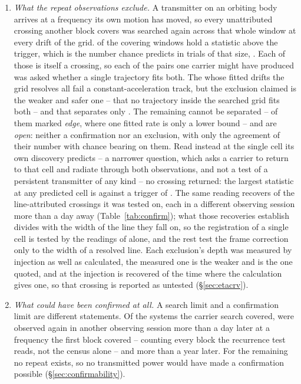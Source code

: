 \begin{enumerate}[leftmargin=1.6em,itemsep=4pt,topsep=4pt,parsep=0pt]
\item \emph{What the repeat observations exclude.} A transmitter on an
orbiting body arrives at a frequency its own motion has moved, so every
unattributed crossing another block covers was searched again across that
whole window at every drift of the grid. \WdNExc{} of the \WdNCov{} covering
windows hold a statistic above the trigger, which is the number chance
predicts in trials of that size, \WdExpect. Each of those is itself a
crossing, so each of the \TjNPair{} pairs one carrier might have produced
was asked whether a single trajectory fits both. The \TjNPower{} whose
fitted drifts the grid resolves all fail a constant-acceleration track, but
the exclusion claimed is the weaker and safer one -- that no trajectory
inside the searched grid fits both -- and that separates only \TjNExcl.
The remaining \TjNOpen{} cannot be separated -- \TjNPairEdge{} of them
marked \emph{edge}, where one fitted rate is only a lower bound -- and are
\emph{open}: neither a confirmation nor an exclusion, with only the
agreement of their number with chance bearing on them. Read instead at the single cell
its own discovery predicts -- a narrower question, which asks a carrier to
return to that cell and radiate through both observations, and not a test of a
persistent transmitter of any kind -- no crossing returned: the largest
statistic at any predicted cell is \RcTMax{} against a trigger of
\StageNullTrig. The same reading recovers \MkAttrRecur{} of the
\MkAttrTested{} line-attributed crossings it was tested on, each in a
different observing session more than a day away
(Table~\ref{tab:confirm}); what those recoveries establish divides with the
width of the line they fall on, so the registration of a single cell is
tested by the \RgRegNUnres{} readings of \RgRegStar{} alone, and the rest
test the frame correction only to the width of a resolved line. Each
exclusion's depth was measured by injection as well as calculated, the
measured one is the weaker and is the one quoted, and at \HjEtaStar{} the
injection is recovered \HjEtaMeas{} of the time where the calculation gives
one, so that crossing is reported as untested
(\S\ref{sec:etacrv}).

\item \emph{What could have been confirmed at all.} A search limit and a
confirmation limit are different statements. Of the \NSysClassA{} systems the
carrier search covered, \ZcConfSysDay{} were observed again in another
observing session more than a day later at a frequency the first block
covered -- counting every
block the recurrence test reads, not the census alone -- and \ZcConfSysYr{}
more than a year later. For the remaining \ZcNoRepSys{} no repeat exists, so
no transmitted power would have made a confirmation possible
(\S\ref{sec:confirmability}).


\end{enumerate}
